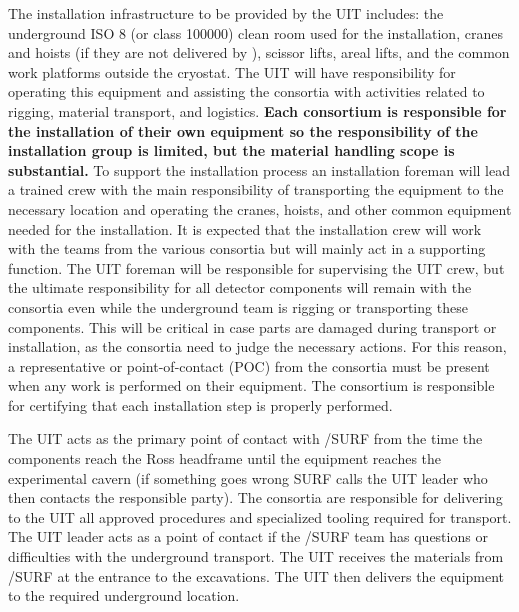 The installation infrastructure to be provided by the UIT includes: the underground ISO 8 (or
class \num{100000}) clean room used for the installation, cranes and hoists (if they are not delivered by
), scissor lifts, areal lifts, and the common work platforms
outside the cryostat. The UIT will have responsibility for operating
this equipment and assisting the consortia with activities related to
rigging, material transport, and logistics. {\bf Each consortium is
  responsible for the installation of their own equipment so the
  responsibility of the installation group is limited, but the material
  handling scope is substantial.} To support the installation process
an installation foreman will lead a trained crew with the main
responsibility of transporting the equipment to the necessary location
and operating the cranes, hoists, and other common equipment needed
for the installation. It is expected that the installation crew will
work with the teams from the various consortia but will mainly act in
a supporting function. The UIT foreman will be responsible for
supervising the UIT crew, but the ultimate responsibility for all
detector components will remain with the consortia even while the
underground team is rigging or transporting these components.  This
will be critical in case parts are damaged during transport or
installation, as the consortia need to judge the necessary
actions. For this reason, a representative or point-of-contact (POC)
from the consortia must be present when any work is performed on their
equipment. The consortium is responsible for certifying that each
installation step is properly performed.

The UIT acts as the primary point of contact with /SURF from the
time the components reach the Ross headframe until the equipment reaches
the experimental cavern (if something goes wrong SURF calls the UIT
leader who then contacts the responsible party). The consortia are
responsible for delivering to the UIT all approved procedures and
specialized tooling required for transport. The UIT leader acts as a
point of contact if the /SURF team has questions or difficulties
with the underground transport.  The UIT receives the materials from
/SURF at the entrance to the  excavations. The UIT then
delivers the equipment to the required underground location.

